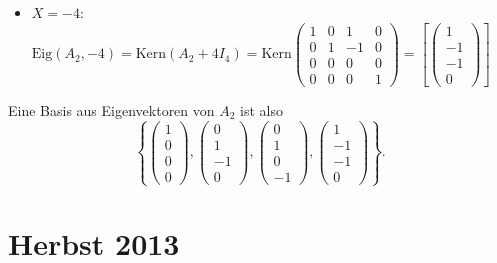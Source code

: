 \begin{enumerate}
\begin{itemize}
	 		\item \( X = -4 \): \( \text{Eig}(A_2, -4) = \text{Kern}(A_2 + 4I_4) = \text{Kern}\begin{pmatrix}
	 			1 & 0 & 1 & 0 \\
	 			0 & 1 & -1 & 0 \\
	 			0 & 0 & 0 & 0 \\
	 			0 & 0 & 0 & 1
	 		\end{pmatrix} = \left [ \begin{pmatrix}
	 			1 \\ -1 \\ -1 \\ 0
	 		\end{pmatrix} \right ] \)
	 	\end{itemize}
	 	Eine Basis aus Eigenvektoren von \( A_2 \) ist also
	 	\begin{equation*}
	 		\left\{ \begin{pmatrix}
	 			1 \\ 0 \\ 0 \\ 0
	 		\end{pmatrix}, \begin{pmatrix}
	 			0 \\ 1 \\ -1 \\ 0
	 		\end{pmatrix}, \begin{pmatrix}
	 			0 \\ 1 \\ 0 \\ -1
	 		\end{pmatrix}, \begin{pmatrix}
	 			1 \\ -1 \\ -1 \\ 0
	 		\end{pmatrix} \right\}\text{.}
	 	\end{equation*}
\end{enumerate}

\newpage

\section{Herbst 2013}

